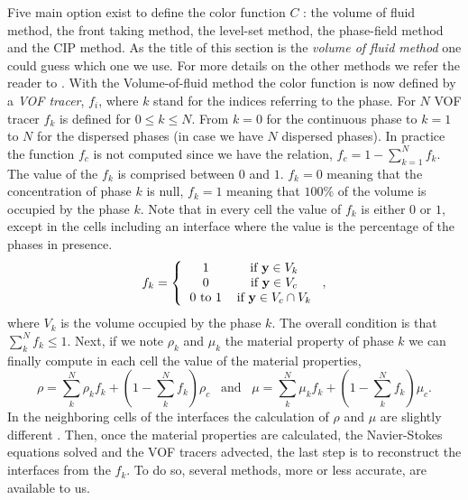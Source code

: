 Five main option exist to define the color function $C$ :
the volume of fluid method,
the front taking method,
the level-set method,
the phase-field method
and the CIP method.
As the title of this section is the \textit{volume of fluid method} one could guess which one we use. 
For more details on the other methods we refer the reader to \cite[Chapter 4]{tryggvason2011direct}. 
With the Volume-of-fluid method the color function is now defined by a \textit{VOF tracer}, $f_i$, where $k$ stand for the indices referring to the phase. 
For $N$ VOF tracer $f_k$ is defined for $0\leq k\leq N$.
From $k=0$ for the continuous phase to $k=1$ to $N$ for the dispersed phases (in case we have $N$ dispersed phases). 
In practice the function $f_c$ is not computed since we have the relation, $f_c = 1- \sum_{k=1}^N f_k$. 
The value of the $f_k$ is comprised between $0$ and $1$.
$f_k = 0$ meaning that the concentration of phase $k$ is null, $f_k = 1$ meaning that $100\%$ of the volume is occupied by the phase $k$. 
Note that in every cell the value of $f_k$ is either $0$ or $1$, except in the cells including an interface where the value is the percentage of the phases in presence.
\begin{equation}
    f_k = \left\{\begin{tabular}{cc}
        $1$  &if $\textbf{y}\in V_k$\\
        $0$  &if $\textbf{y}\in V_c$\\
        $0$ to $1$  &if $\textbf{y}\in V_c \cap V_k$\\
    \end{tabular}
    \right.,
\end{equation}
where $V_k$ is the volume occupied by the phase $k$.
The overall condition is that $\sum_k^N f_k \leq 1$.
Next, if we note $\rho_k$ and $\mu_k$ the material property of phase $k$ we can finally compute in each cell the value of the material properties,
\begin{equation*}
    \rho 
    = \sum_k^N \rho_k f_k 
    + (1-\sum_k^Nf_k)\rho_c 
    \;\;\;\text{and}\;\;\;
    \mu 
    = \sum_k^N\mu_k f_k 
    + (1-\sum_k^Nf_k)\mu_c.
\end{equation*} 
In the neighboring cells of the interfaces the calculation of $\rho$ and $\mu$ are slightly different \citep{tryggvason2011direct}. 
Then, once the material properties are calculated, the Navier-Stokes equations solved and the VOF tracers advected, the last step is to reconstruct the interfaces from the $f_k$.
To do so, several methods, more or less accurate, are available  to us.
